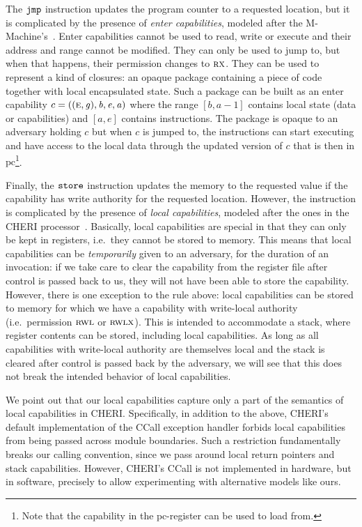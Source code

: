 \documentclass{llncs}
\newcommand\lau[1]{{\color{purple} \sf \footnotesize {LS: #1}}\\}
\renewcommand\lau[1]{}
\newcommand{\var}[1]{\mathit{#1}}
\newcommand{\gl}{\var{g}}
\newcommand{\pcreg}{\mathrm{pc}}
\newcommand{\addr}{\var{a}}
\newcommand{\start}{\var{b}}
\newcommand{\addrend}{\var{e}}
\newcommand{\zinstr}[1]{\mathtt{#1}}
\newcommand{\oneinstr}[2]{
  \ifthenelse{\equal{#2}{}}
  {\zinstr{#1}}
  {\zinstr{#1} \; #2}
}
\newcommand{\jmp}[1]{\oneinstr{jmp}{#1}}
\newcommand{\twoinstr}[3]{
  \ifthenelse{\equal{#2#3}{}}
  {\zinstr{#1}}
  {\zinstr{#1} \; #2 \; #3}
}
\newcommand{\store}[2]{\twoinstr{store}{#1}{#2}}
\newcommand{\plainperm}[1]{\textsc{#1}}
\newcommand{\exec}{\plainperm{rx}}
\newcommand{\entry}{\plainperm{e}}
\newcommand{\readwritel}{\plainperm{rwl}}
\newcommand{\rwl}{\readwritel}
\newcommand{\rwlx}{\plainperm{rwlx}}
\begin{document}
The $\jmp{}$ instruction updates the program counter to a requested location,
but it is complicated by the presence of \emph{enter capabilities}, modeled
after the M-Machine's~\cite{Carter:1994:HSF:195473.195579}. Enter capabilities
cannot be used to read, write or execute and their address and range cannot be
modified. They can only be used to jump to, but when that happens, their
permission changes to $\exec$. They can be used to represent a kind of closures:
an opaque package containing a piece of code together with local encapsulated
state. Such a package can be built as an enter capability $c =
((\entry,\gl),\start,\addrend,\addr)$ where the range $[\start,\addr-1]$
contains local state (data or capabilities) and $[\addr,\addrend]$ contains
instructions. The package is opaque to an adversary holding $c$ but when $c$ is
jumped to, the instructions can start executing and have access to the local
data through the updated version of $c$ that is then in $\pcreg$\footnote{Note
that the capability in the $\pcreg$-register can be used to load from.}.  %
\lau{As we %
the TR, so %
here. }

Finally, the $\store{}{}$ instruction updates the memory to the requested value
if the capability has write authority for the requested location. However, the
instruction is complicated by the presence of \emph{local capabilities}, modeled
after the ones in the CHERI processor~\cite{Watson2015Cheri}. Basically, local
capabilities are special in that they can only be kept in registers, i.e.\ they
cannot be stored to memory. This means that local capabilities can be
\emph{temporarily} given to an adversary, for the duration of an invocation: if
we take care to clear the capability from the register file after control is
passed back to us, they will not have been able to store the capability.
However, there is one exception to the rule above: local capabilities can be
stored to memory for which we have a capability with write-local authority
(i.e.\ permission $\rwl$ or $\rwlx$). This is intended to accommodate a stack,
where register contents can be stored, including local capabilities. As long as
all capabilities with write-local authority are themselves local and the stack
is cleared after control is passed back by the adversary, we will see that this
does not break the intended behavior of local capabilities.

We point out that our local capabilities capture only a part of the semantics of
local capabilities in CHERI. Specifically, in addition to the above, CHERI's
default implementation of the CCall exception handler forbids local capabilities
from being passed across module boundaries. Such a restriction fundamentally
breaks our calling convention, since we pass around local return pointers and
stack capabilities. However, CHERI's CCall is not implemented in hardware, but
in software, precisely to allow experimenting with alternative models like ours.
\end{document}
